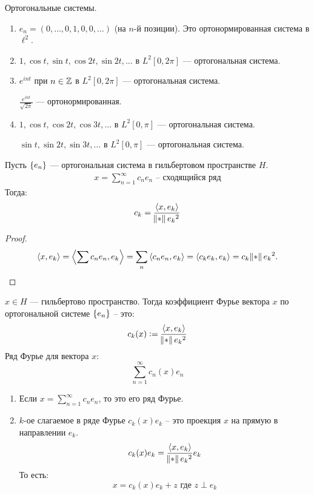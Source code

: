 \begin{examples} Ортогональные системы.
    \begin{enumerate}
        \item $e_n = (0, \ldots, 0, 1, 0, 0, \ldots)$ (на $n$-й позиции). Это ортонормированная система в $\ell^2$.
        \item $1, \cos t, \sin t, \cos 2t, \sin 2t, \ldots$ в $L^2[0, 2\pi]$ --- ортогональная система.
        \item $e^{i n t}$ при $n \in \mathbb{Z}$ в $L^2[0, 2\pi]$ --- ортогональная система.

              $\frac{e^{int}}{\sqrt{2\pi}}$ --- ортонормированная.
        \item $1, \cos t, \cos 2t, \cos 3t, \ldots$ в $L^2[0, \pi]$ --- ортогональная система.

              $\sin t, \sin 2t, \sin 3t, \ldots$ в $L^2[0, \pi]$ --- ортогональная система.
    \end{enumerate}
\end{examples}

\begin{theorem}
    Пусть $\set{e_n}$ --- ортогональная система в гильбертовом пространстве $H$.
    \begin{gather*}
        x = \sum\limits_{n=1}^\infty c_n e_n \text{ -- сходящийся ряд}
    \end{gather*}
    Тогда: 
    $$c_k = \dfrac{\dotprod{x}{e_k}}{\norm{e_k}^2}$$
\end{theorem}
\begin{proof}
    \[
        \dotprod{x}{e_k} = \dotprod{\sum c_n e_n}{e_k} = \sum\limits_n \dotprod{c_n e_n}{e_k} = \dotprod{c_k e_k}{e_k} = c_k \norm{e_k}^2
        .\]
\end{proof}

\begin{definition}
    $x \in H$ --- гильбертово пространство.
    Тогда коэффициент Фурье вектора $x$ по ортогональной системе $\set{e_n}$ -- это: 
    $$c_k(x) := \dfrac{\dotprod{x}{e_k}}{\norm{e_k}^2}$$ 
    Ряд Фурье для вектора $x$:
    $$\sum\limits_{n=1}^\infty c_n(x) e_n$$ 
\end{definition}

\begin{observation} \quad 

    \begin{enumerate}
        \item Если $x = \sum\limits_{n=1}^\infty c_n e_n$, то это его ряд Фурье.
        \item $k$-ое слагаемое в ряде Фурье $c_k(x) e_k$ -- это проекция $x$ на прямую в направлении $e_k$.
        $$c_k(x) e_k = \dfrac{\dotprod{x}{e_k}}{\norm{e_k}^2} e_k$$
        То есть:
        $$x = c_k(x)e_k + z \text { где } z \perp e_k$$
    \end{enumerate}
\end{observation}


\newpage

